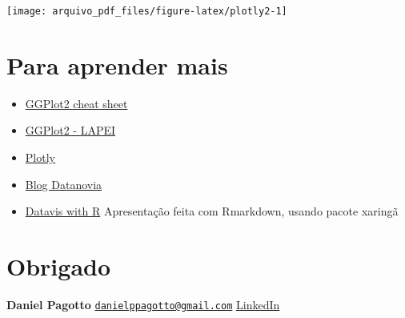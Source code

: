 \documentclass[
]{article}
\providecommand{\tightlist}{%
  \setlength{\itemsep}{0pt}\setlength{\parskip}{0pt}}
\begin{document}
\begin{center}\texttt{[image: arquivo\_pdf\_files/figure-latex/plotly2-1]} \end{center}

\hypertarget{para-aprender-mais}{%
\section{Para aprender mais}\label{para-aprender-mais}}

\begin{itemize}
\tightlist
\item
  \href{https://rstudio.com/wp-content/uploads/2015/03/ggplot2-cheatsheet.pdf}{GGPlot2
  cheat sheet}
\item
  \href{https://www.youtube.com/watch?v=IPyjHKe30eo}{GGPlot2 - LAPEI}
\item
  \href{https://plotly.com/}{Plotly}
\item
  \href{https://www.datanovia.com/en/blog/gganimate-how-to-create-plots-with-beautiful-animation-in-r/}{Blog
  Datanovia}
\item
  \href{https://rkabacoff.github.io/datavis/Interactive.html}{Datavis
  with R} Apresentação feita com Rmarkdown, usando pacote xaringã
\end{itemize}

\hypertarget{obrigado}{%
\section{Obrigado}\label{obrigado}}

\textbf{Daniel Pagotto} \textbar{}
\href{mailto:danielppagotto@gmail.com}{\nolinkurl{danielppagotto@gmail.com}}
\textbar{}
\href{https://www.linkedin.com/in/daniel-do-prado-pagotto-bab62a50/}{LinkedIn}
\end{document}
